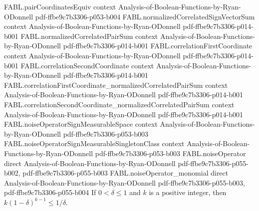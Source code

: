 \begin{theorem}
\proofstep
  {FABL.pairCoordinatesEquiv}
  {context}
  {Analysis-of-Boolean-Functions-by-Ryan-ODonnell}
  {pdf-ffbe9c7b3306-p053-b004}
\proofstep
  {FABL.normalizedCorrelatedSignVectorSum}
  {context}
  {Analysis-of-Boolean-Functions-by-Ryan-ODonnell}
  {pdf-ffbe9c7b3306-p014-b001}
\proofstep
  {FABL.normalizedCorrelatedPairSum}
  {context}
  {Analysis-of-Boolean-Functions-by-Ryan-ODonnell}
  {pdf-ffbe9c7b3306-p014-b001}
\proofstep
  {FABL.correlationFirstCoordinate}
  {context}
  {Analysis-of-Boolean-Functions-by-Ryan-ODonnell}
  {pdf-ffbe9c7b3306-p014-b001}
\proofstep
  {FABL.correlationSecondCoordinate}
  {context}
  {Analysis-of-Boolean-Functions-by-Ryan-ODonnell}
  {pdf-ffbe9c7b3306-p014-b001}
\proofstep
  {FABL.correlationFirstCoordinate_normalizedCorrelatedPairSum}
  {context}
  {Analysis-of-Boolean-Functions-by-Ryan-ODonnell}
  {pdf-ffbe9c7b3306-p014-b001}
\proofstep
  {FABL.correlationSecondCoordinate_normalizedCorrelatedPairSum}
  {context}
  {Analysis-of-Boolean-Functions-by-Ryan-ODonnell}
  {pdf-ffbe9c7b3306-p014-b001}
\proofstep
  {FABL.noiseOperatorSignMeasurableSpace}
  {context}
  {Analysis-of-Boolean-Functions-by-Ryan-ODonnell}
  {pdf-ffbe9c7b3306-p053-b003}
\proofstep
  {FABL.noiseOperatorSignMeasurableSingletonClass}
  {context}
  {Analysis-of-Boolean-Functions-by-Ryan-ODonnell}
  {pdf-ffbe9c7b3306-p053-b003}
\proofstep
  {FABL.noiseOperator}
  {direct}
  {Analysis-of-Boolean-Functions-by-Ryan-ODonnell}
  {pdf-ffbe9c7b3306-p055-b002,
    pdf-ffbe9c7b3306-p055-b003}
\proofstep
  {FABL.noiseOperator_monomial}
  {direct}
  {Analysis-of-Boolean-Functions-by-Ryan-ODonnell}
  {pdf-ffbe9c7b3306-p055-b003,
    pdf-ffbe9c7b3306-p055-b004}
\label{FABL.card_mul_one_sub_pow_le_inv}
\leanok
{}
If $0<\delta\le 1$ and $k$ is a positive integer, then $k(1-\delta)^{k-1}\le 1/\delta$.
\end{theorem}

